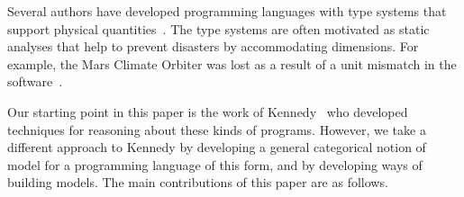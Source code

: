\documentclass[a4paper,UKenglish]{lipics}
\theoremstyle{plain}
\begin{document}
 Several authors have developed programming languages with type systems that support physical quantities~\cite{house1983proposal, manner1986strong, wand1991automatic, Kennedy:1997:RPU:263699.263761, erwig2002adding}. The type systems are often motivated as static analyses that help to prevent disasters by accommodating dimensions. For example, the Mars Climate Orbiter was lost as a result of a unit mismatch in the software~\cite{MarsCrash}.

Our starting point in this paper is the work of Kennedy~\cite{Kennedy:1997:RPU:263699.263761} who developed techniques for reasoning about these kinds of programs. However, we take a different approach to Kennedy by developing a general categorical notion of model for a programming language of this form, and by developing ways of building models. The main contributions of this paper are as follows.
\end{document}
